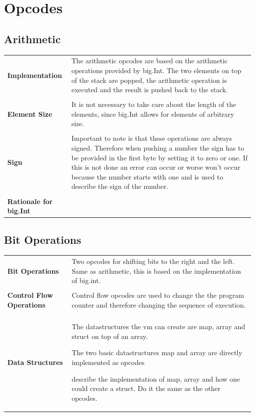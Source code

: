 \section{Opcodes}
\subsection{Arithmetic}
\begin{tabular}[t]{ p{3cm} p{12.5cm}}
\raggedright
\textbf{Implementation} & 
The arithmetic opcodes are based on the arithmetic operations provided by big.Int. The two elements on top of the stack are popped, the arithmetic operation is executed and the result is pushed back to the stack. \\ \\

\raggedright
\textbf{Element Size} & 
 It is not necessary to take care about the length of the elements, since big.Int allows for elements of arbitrary size. \\ \\

\raggedright
\textbf{Sign} & 
Important to note is that these operations are always signed. Therefore when pushing a number the sign has to be provided in the first byte by setting it to zero or one. If this is not done an error can occur or worse won't occur because the number starts with one and is used to describe the sign of the number. \\ \\

\textbf{Rationale for big.Int} & 
\\
\end{tabular}
\subsection{Bit Operations}
\begin{tabular}[t]{ p{3cm} p{12.5cm}}
\raggedright
\textbf{Bit Operations} & 
Two opcodes for shifting bits to the right and the left. Same as arithmetic, this is based on the implementation of big.int. \\ \\

\raggedright
\textbf{Control Flow Operations} & 
Control flow opcodes are used to change the  the program counter and therefore changing the sequence of execution. \\ \\

\raggedright
\textbf{Data Structures} & 
The datastructures the vm can create are map, array and struct on top of an array. 

The two basic datastructures map and array are directly implemented as opcodes

describe the implementation of map, array and how one could create a struct. Do it the same as the other opcodes.
\end{tabular}
